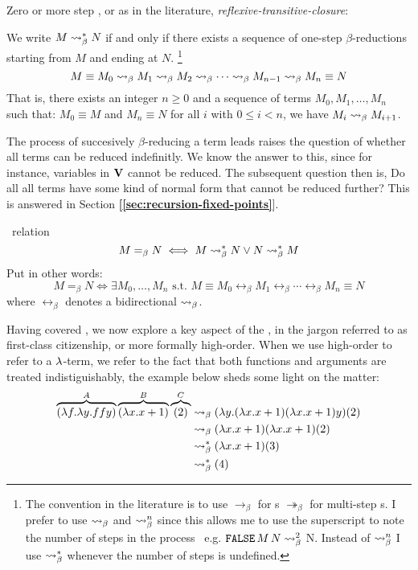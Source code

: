 \documentclass[12pt]{book}
\newcommand{\myref}[1]{\textcolor{refcolor}{\textbf{[\hyperref[#1]{\ref*{#1}}}]}}
\newcommand{\step}{\curly} %
\begin{document}
\begin{definition} Zero or more step \bred, or as in the literature, \emph{reflexive-transitive-closure}:

\smallskip
We write $M \step^* N$ if and only if there exists a sequence of one-step $\beta$-reductions starting from $M$ and ending at $N$. \footnote{The convention in the literature is to use $\rightarrow_\beta$ for \bred s $\twoheadrightarrow_\beta$ for multi-step \bred s. I prefer to use $\mathrel{\leadsto}_\beta$ and $\mathrel{\leadsto}_\beta^n$ since this allows me to use the superscript to note the number of steps in the process \bred \ e.g. $ \texttt{FALSE} \, M \, N \mathrel{\leadsto}_\beta^2 $ N. Instead of $\mathrel{\leadsto}_\beta^n$ I use $\mathrel{\leadsto}_\beta^*$ whenever the number of steps is undefined.}
\[
  M \equiv M_0 \step M_1 \step M_2 \step \cdots \step M_{n-1} \step M_n \equiv N
\]
That is, there exists an integer $n \geq 0$ and a sequence of terms $M_0, M_1, \dots, M_n$ such that: $ M_0 \equiv M $ and $ M_n \equiv N $ for all $ i $ with $ 0 \leq i < n $, we have $ M_i \step M_{i+1} $.
\end{definition}
The process of succesively $\beta$-reducing a term leads raises the question of whether all terms can be reduced indefinitly. We know the answer to this, since for instance, variables in $\mathbf{V}$ cannot be reduced. The subsequent question then is, Do all all terms have some kind of normal form that cannot be reduced further? This is answered in Section \myref{sec:recursion-fixed-points}.

\begin{definition} \bequiv \ relation  \\
\[
  M =_\beta N \iff M \step^* N \lor N \step^* M
\]
Put in other words:
\[
    M =_\beta N \iff \exists M_0, \dots, M_n \text{ s.t. } M \equiv M_0 \leftrightarrow_\beta M_1 \leftrightarrow_\beta \cdots \leftrightarrow_\beta M_n \equiv N
\]
where $ \leftrightarrow_\beta $ denotes a bidirectional $\mathrel{\leadsto}_\beta$.
\end{definition}

Having covered \bred, we now explore a key aspect of the \lcalc, in the jargon referred to as first-class citizenship, or more formally high-order. When we use high-order to refer to a $\lambda$-term, we refer to the fact that both functions and arguments are treated indistiguishably, the example below sheds some light on the matter:
\begin{align*}
  \overbrace { (\lambda f . \lambda y . f f y) }^{A} \overbrace{ (\lambda x . x + 1) }^{B} \overbrace{(2)}^{C}
  &\mathrel{\leadsto}_\beta (\lambda y .(\lambda x . x + 1) (\lambda x . x + 1)y)(2) \\
  &\mathrel{\leadsto}_\beta (\lambda x . x + 1)(\lambda x . x + 1)(2) \\
  &\mathrel{\leadsto}_\beta^* (\lambda x . x + 1) (3) \\
  &\mathrel{\leadsto}_\beta^* (4)
\end{align*}
\end{document}
